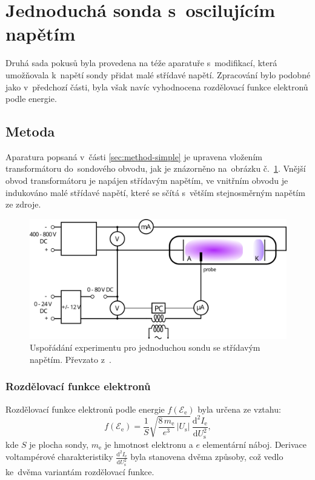 \documentclass{protokol}
\newcommand\elemcharge{e}
\newcommand\masselec{m_\mathrm{e}}
\newcommand\ielec{I_\mathrm{e}}
\newcommand\uprobe{U_\mathrm{s}}
\newcommand\didu{\frac{\mathrm d^2 \ielec}{\mathrm d \uprobe^2}}
\newcommand\enelec{\mathcal E_\mathrm{e}}
\newcommand\eedf{f(\enelec)}
\newcommand\probesurf{S}
\begin{document}
\clearpage
\section{Jednoduchá sonda s~oscilujícím napětím}
\label{sec:eedf}
Druhá sada pokusů byla provedena na téže aparatuře s~modifikací,
která umožňovala k~napětí sondy přidat malé střídavé napětí.
Zpracování bylo podobné jako v~předchozí části,
byla však navíc vyhodnocena rozdělovací funkce elektronů podle energie.

\subsection{Metoda}
\label{sec:method-eedf}
Aparatura popsaná v~části \ref{sec:method-simple} je upravena
vložením transformátoru do~sondového obvodu,
jak je znázorněno na~obrázku č.~\ref{fig:diagram-eedf}.
Vnější obvod transformátoru je napájen střídavým napětím,
ve vnitřním obvodu je indukováno malé střídavé napětí,
které se sčítá s~větším stejnosměrným napětím ze zdroje.

\begin{figure}[hbp]
	\centering
	\includegraphics{diagram-eedf.png}
	\caption{Uspořádání experimentu pro jednoduchou sondu se střídavým napětím.
		Převzato z~\autocite{assignment-simpleprobe}.}
	\label{fig:diagram-eedf}
\end{figure}

\subsubsection{Rozdělovací funkce elektronů}
\label{sec:eedf-eedf}
Rozdělovací funkce elektronů podle energie $\eedf$ byla určena ze vztahu:
\begin{equation}
	\label{eq:eedf}
	\eedf = \frac{1}{\probesurf}
		\sqrt{\frac{8\,\masselec}{\elemcharge^3}\,|\uprobe|}
		\,\frac{\mathrm d^2 \ielec}{\mathrm d\uprobe^2},
\end{equation}
kde $\probesurf$ je plocha sondy, $\masselec$ je hmotnost elektronu
a $\elemcharge$ elementární náboj.
Derivace voltampérové charakteristiky $\didu$ byla stanovena dvěma způsoby,
což vedlo ke~dvěma variantám rozdělovací funkce.
\end{document}
